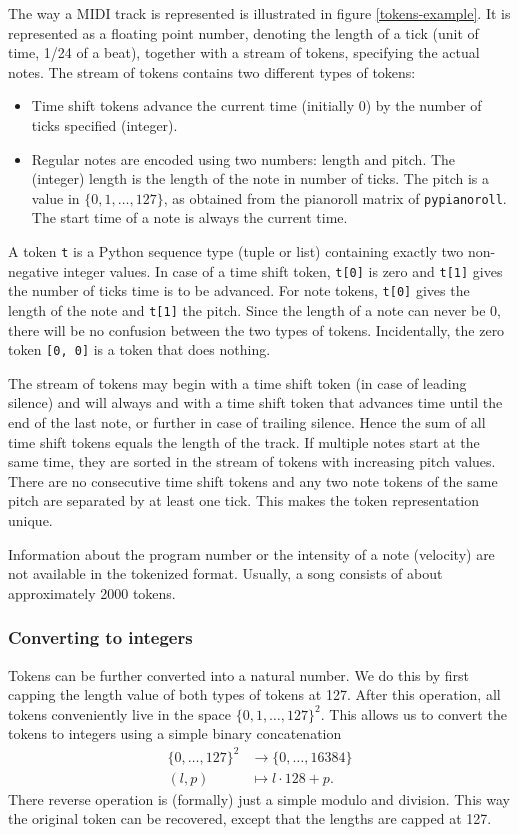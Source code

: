 \documentclass[a4paper]{article}
\begin{document}
The way a MIDI track is represented is illustrated in figure \ref{tokens-example}. It is represented as a floating point number, denoting the length of a tick (unit of time, 1/24 of a beat), together with a stream of tokens, specifying the actual notes. The stream of tokens contains two different types of tokens:
\begin{itemize}
\item Time shift tokens advance the current time (initially 0) by the number of ticks specified (integer).
\item Regular notes are encoded using two numbers: length and pitch. The (integer) length is the length of the note in number of ticks. The pitch is a value in $\{0, 1, \ldots, 127\}$, as obtained from the pianoroll matrix of \texttt{pypianoroll}. The start time of a note is always the current time.
\end{itemize}
A token \texttt{t} is a Python sequence type (tuple or list) containing exactly two non-negative integer values. In case of a time shift token, \texttt{t[0]} is zero and \texttt{t[1]} gives the number of ticks time is to be advanced. For note tokens, \texttt{t[0]} gives the length of the note and \texttt{t[1]} the pitch. Since the length of a note can never be 0, there will be no confusion between the two types of tokens. Incidentally, the zero token \texttt{[0, 0]} is a token that does nothing.

The stream of tokens may begin with a time shift token (in case of leading silence) and will always and with a time shift token that advances time until the end of the last note, or further in case of trailing silence. Hence the sum of all time shift tokens equals the length of the track. If multiple notes start at the same time, they are sorted in the stream of tokens with increasing pitch values. There are no consecutive time shift tokens and any two note tokens of the same pitch are separated by at least one tick. This makes the token representation unique.

Information about the program number or the intensity of a note (velocity) are not available in the tokenized format. Usually, a song consists of about approximately 2000 tokens.

\subsubsection{Converting to integers}

Tokens can be further converted into a natural number. We do this by first capping the length value of both types of tokens at 127. After this operation, all tokens conveniently live in the space $\{0, 1, \ldots, 127\}^2$. This allows us to convert the tokens to integers using a simple binary concatenation \begin{align*}
\{0, \ldots, 127\}^2 &\to \{0, \ldots, 16384\} \\
(l, p) &\mapsto l\cdot128+p.
\end{align*}
There reverse operation is (formally) just a simple modulo and division. This way the original token can be recovered, except that the lengths are capped at 127.
\end{document}
